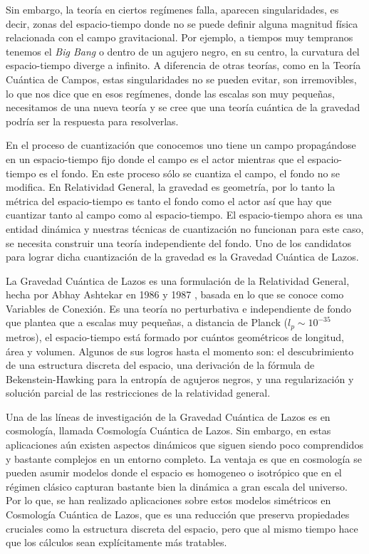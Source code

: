 \documentclass[11pt, letterpaper, spanish]{book}
\theoremstyle{definition}
\theoremstyle{plain}
\theoremstyle{remark}
\theoremstyle{break}
\begin{document}
Sin embargo, la teor\'{i}a en ciertos reg\'{i}menes falla, aparecen singularidades, es decir, zonas del espacio-tiempo donde no se puede definir alguna magnitud f\'{i}sica relacionada con el campo gravitacional. Por ejemplo, a tiempos muy tempranos tenemos el \emph{Big Bang} o dentro de un agujero negro, en su centro, la curvatura del espacio-tiempo diverge a infinito. A diferencia de otras teor\'{i}as, como en la Teor\'{i}a Cu\'{a}ntica de Campos, estas singularidades no se pueden evitar, son irremovibles, lo que nos dice que en esos reg\'{i}menes, donde las escalas son muy peque\~{n}as, necesitamos de una nueva teor\'{i}a y se cree que una teor\'{i}a cu\'{a}ntica de la gravedad podr\'{i}a ser la respuesta para resolverlas.

En el proceso de cuantizaci\'{o}n que conocemos uno tiene un campo propag\'{a}ndose en un espacio-tiempo fijo donde el campo es el actor mientras que el espacio-tiempo es el fondo. En este proceso s\'{o}lo se cuantiza el campo, el fondo no se modifica. En Relatividad General, la gravedad es geometr\'{i}a, por lo tanto la m\'{e}trica del espacio-tiempo es tanto el fondo como el actor as\'{i} que hay que cuantizar tanto al campo como al espacio-tiempo. El espacio-tiempo ahora es una entidad din\'{a}mica y nuestras t\'{e}cnicas de cuantizaci\'{o}n no funcionan para este caso, se necesita construir una teor\'{i}a independiente del fondo. Uno de los candidatos para lograr dicha cuantizaci\'{o}n de la gravedad es la Gravedad Cu\'{a}ntica de Lazos.

La Gravedad Cu\'{a}ntica de Lazos es una formulaci\'{o}n de la Relatividad General, hecha por Abhay Ashtekar en 1986 y 1987 \cite{Ashtekar86, Ashtekar87}, basada en lo que se conoce como Variables de Conexi\'{o}n. Es una teor\'{i}a no perturbativa e independiente de fondo que plantea que a escalas muy peque\~{n}as, a distancia de Planck ($l_{p} \sim 10^{-35}$ metros), el espacio-tiempo est\'{a} formado por cu\'{a}ntos geom\'{e}tricos de longitud, \'{a}rea y volumen. Algunos de sus logros hasta el momento son: el descubrimiento de una estructura discreta del espacio, una derivaci\'{o}n de la f\'{o}rmula de Bekenstein-Hawking para la entrop\'{i}a de agujeros negros, y una regularizaci\'{o}n y soluci\'{o}n parcial de las restricciones de la relatividad general. 

Una de las l\'{i}neas de investigaci\'{o}n de la Gravedad Cu\'{a}ntica de Lazos es en cosmolog\'{i}a, llamada Cosmolog\'{i}a Cu\'{a}ntica de Lazos. Sin embargo, en estas aplicaciones a\'{u}n existen aspectos din\'{a}micos que siguen siendo poco comprendidos y bastante complejos en un entorno completo. La ventaja es que en cosmolog\'{i}a se pueden asumir modelos donde el espacio es homogeneo o isotr\'{o}pico que en el r\'{e}gimen cl\'{a}sico capturan bastante bien la din\'{a}mica a gran escala del universo. Por lo que, se han realizado aplicaciones sobre estos modelos sim\'{e}tricos en Cosmolog\'{i}a Cu\'{a}ntica de Lazos, que es una reducci\'{o}n que preserva propiedades cruciales como la estructura discreta del espacio, pero que al mismo tiempo hace que los c\'{a}lculos sean expl\'{i}citamente m\'{a}s tratables.
\end{document}
